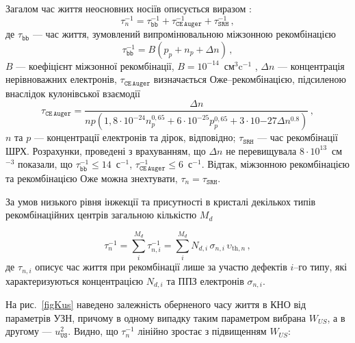 Загалом час життя неосновних носіїв описується виразом \cite{MurphyJAP2011}:
\begin{equation}
\label{eqTAUsum}
\tau_n^{-1}=\tau_\mathtt{bb}^{-1}+\tau_\mathtt{CE\,Auger}^{-1}+\tau_\mathtt{SRH}^{-1}\,,
\end{equation}
де
$\tau_\mathtt{bb}$ --- час життя, зумовлений випромінювальною міжзонною рекомбінацією
\begin{equation}
\label{eqTAUbb}
\tau_\mathtt{bb}^{-1}=B(p_p+n_p+\Delta n)\,,
\end{equation}
$B$ --- коефіцієнт міжзонної рекомбінації, $B=10^{-14}$~см$^3$c$^{-1}$ \cite{Si:TAUbb,MurphyJAP2011},
$\Delta n$ --- концентрація нерівноважних електронів,
$\tau_\mathtt{CE\,Auger}$ визначається Оже--рекомбінацією, підсиленою внаслідок кулонівської взаємодії  \cite{Si:TAUAuger}
\begin{equation}
\label{eqTAAuger}
\tau_\mathtt{CE\,Auger}=\frac{\Delta n}{np\left(1,8\cdot10^{-24}n_p^{0,65}+6\cdot10^{-25}p_p^{0,65}+3\cdot10{-27}\Delta n^{0.8}\right)}\,,
\end{equation}
$n$ та $p$ --- концентрації електронів та дірок, відповідно;
$\tau_\mathtt{SRH}$ --- час рекомбінації ШРХ.
Розрахунки, проведені з врахуванням, що
$\Delta n$ не перевищувала $8\cdot10^{13}$~см$^{-3}$
показали, що $\tau_\mathtt{bb}^{-1}\leq14$~с$^{-1}$, $\tau_\mathtt{CE\,Auger}^{-1}\leq6$~с$^{-1}$.
Відтак, міжзонною рекомбінацією та рекомбінацією Оже можна знехтувати, $\tau_n=\tau_\mathtt{SRH}$.

За умов низького рівня інжекції та присутності в кристалі декількох типів рекомбінаційних центрів
загальною кількістю $M_d$

\begin{equation}
\label{eqTAUSHRsum}
\tau_n^{-1}=\sum_i^{M_d}\tau_{n,i}^{-1}=\sum_i^{M_d}N_{d,i}\,\sigma_{n,i}\,\upsilon_{\mathrm{th},n}\,,
\end{equation}
де
$\tau_{n,i}$ описує час життя при рекомбінації лише за участю дефектів $i$--го типу,
які характеризуються концентрацією $N_{d,i}$ та ППЗ електронів $\sigma_{n,i}$.

На рис.~\ref{figKus} наведено залежність оберненого часу життя в КНО від параметрів УЗН,
причому в одному випадку таким параметром вибрана $W_{U\!S}$, а в другому --- $u_\mathtt{US}^2$.
Видно, що $\tau_n^{-1}$ лінійно зростає з підвищенням $W_{U\!S}$:

